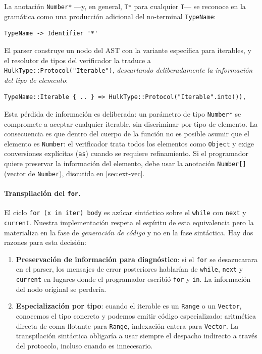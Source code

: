 \documentclass[11pt,a4paper,oneside,openany]{report}
\newcommand{\code}[1]{\texttt{#1}}
\begin{document}
La anotación \code{Number*} ---y, en general, \code{T*} para cualquier
\code{T}--- se reconoce en la gramática como una producción adicional del
no-terminal \code{TypeName}:

\begin{lstlisting}[style=bnf]
TypeName -> Identifier '*'
\end{lstlisting}

El parser construye un nodo del AST con la variante específica para
iterables, y el resolutor de tipos del verificador la traduce a
\code{HulkType::Protocol("Iterable")}, \emph{descartando deliberadamente la
información del tipo de elemento}:

\begin{lstlisting}[style=rustst]
TypeName::Iterable { .. } => HulkType::Protocol("Iterable".into()),
\end{lstlisting}

Esta pérdida de información es deliberada: un parámetro de tipo
\code{Number*} se compromete a aceptar cualquier iterable, sin discriminar
por tipo de elemento. La consecuencia es que dentro del cuerpo de la
función no es posible asumir que el elemento es \code{Number}: el
verificador trata todos los elementos como \code{Object} y exige
conversiones explícitas (\code{as}) cuando se requiere refinamiento. Si el
programador quiere preservar la información del elemento, debe usar la
anotación \code{Number[]} (vector de \code{Number}), discutida en
\cref{sec:ext-vec}.

\paragraph{Transpilación del \code{for}.}
El ciclo \code{for (x in iter) body} es azúcar sintáctico sobre el
\code{while} con \code{next} y \code{current}. Nuestra implementación
respeta el espíritu de esta equivalencia pero la materializa en la fase de
\emph{generación de código} y no en la fase sintáctica. Hay dos razones para
esta decisión:

\begin{enumerate}
  \item \textbf{Preservación de información para diagnóstico}: si el
    \code{for} se desazucarara en el parser, los mensajes de error
    posteriores hablarían de \code{while}, \code{next} y \code{current}
    en lugares donde el programador escribió \code{for} y \code{in}. La
    información del nodo original se perdería.
  \item \textbf{Especialización por tipo}: cuando el iterable es un
    \code{Range} o un \code{Vector}, conocemos el tipo concreto y podemos
    emitir código especializado: aritmética directa de coma flotante para
    \code{Range}, indexación entera para \code{Vector}. La transpilación
    sintáctica obligaría a usar siempre el despacho indirecto a través del
    protocolo, incluso cuando es innecesario.
\end{enumerate}
\end{document}
